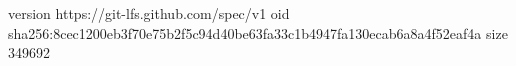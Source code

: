 version https://git-lfs.github.com/spec/v1
oid sha256:8cec1200eb3f70e75b2f5c94d40be63fa33c1b4947fa130ecab6a8a4f52eaf4a
size 349692
